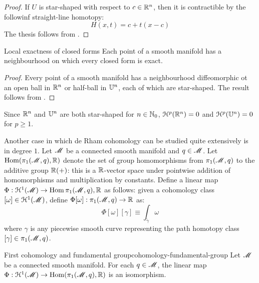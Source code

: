 \begin{proofbox}
  \begin{proof}
    If $ U $ is star-shaped with respect to $ c \in \mathbb{R}^n $, then it is contractible by the followinf straight-line homotopy:
    \begin{equation*}
      H(x,t) = c + t (x - c)
    \end{equation*}
    The thesis follows from .
  \end{proof}
\end{proofbox}

\begin{corollary}{Local exactness of closed forms}{}
  Each point of a smooth manifold has a neighbourhood on which every closed form is exact.
\end{corollary}

\begin{proofbox}
  \begin{proof}
    Every point of a smooth manifold has a neighbourhood diffeomorphic ot an open ball in $ \mathbb{R}^n $ or half-ball in $ \mathbb{U}^n $, each of which are star-shaped. The result follows from .
  \end{proof}
\end{proofbox}

Since $ \mathbb{R}^n $ and $ \mathbb{U}^n $ are both star-shaped for $ n \in \mathbb{N}_0 $, $ \EuScript{H}^{p}(\mathbb{R}^n) = 0 $ and $ \EuScript{H}^{p}(\mathbb{U}^n) = 0 $ for $ p \geq 1 $.

Another case in which de Rham cohomology can be studied quite extensively is in degree $ 1 $. Let $ \mathscr{M} $ be a connected smooth manifold and $ q \in \mathscr{M} $. Let $ \operatorname{Hom}(\pi_1(\mathscr{M},q) , \mathbb{R}) $ denote the set of group homomorphisms from $ \pi_1(\mathscr{M},q) $ to the additive group $ \mathbb{R}(+) $: this is a $ \mathbb{R} $-vector space under pointwise addition of homomorphisms and multiplication by constants. Define a linear map $ \Phi : \EuScript{H}^{1}(\mathscr{M}) \rightarrow \operatorname{Hom}{\pi_1(\mathscr{M},q),\mathbb{R}} $ as follows: given a cohomology class $ [\omega] \in \EuScript{H}^{1}(\mathscr{M}) $, define $ \Phi[\omega] : \pi_1(\mathscr{M},q) \rightarrow \mathbb{R} $ as:
\begin{equation*}
  \Phi[\omega][\gamma] \equiv \int_{\tilde{\gamma}} \omega
\end{equation*}
where $ \gamma $ is any piecewise smooth curve representing the path homotopy class $ [\gamma] \in \pi_1(\mathscr{M},q) $.

\begin{theorem}{First cohomology and fundamental group}{cohomology-fundamental-group}
  Let $ \mathscr{M} $ be a connected smooth manifold. For each $ q \in \mathscr{M} $, the linear map $ \Phi : \EuScript{H}^{1}(\mathscr{M}) \to \operatorname{Hom}(\pi_1(\mathscr{M},q),\mathbb{R}) $ is an isomorphism.
\end{theorem}

